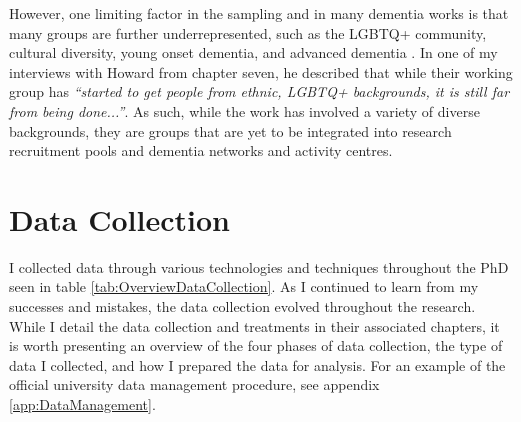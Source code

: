 However, one limiting factor in the sampling and in many dementia works is that many groups are further underrepresented, such as the LGBTQ+ community, cultural diversity, young onset dementia, and advanced dementia \citep{mcgovern2014forgotten}. In one of my interviews with Howard from chapter seven, he described that while their working group has \textit{``started to get people from ethnic, LGBTQ+ backgrounds, it is still far from being done...''}. As such, while the work has involved a variety of diverse backgrounds, they are groups that are yet to be integrated into research recruitment pools and dementia networks and activity centres. 

\section{Data Collection}
\label{Method:DataCollection}
I collected data through various technologies and techniques throughout the PhD seen in table \ref{tab:OverviewDataCollection}. As I continued to learn from my successes and mistakes, the data collection evolved throughout the research. While I detail the data collection and treatments in their associated chapters, it is worth presenting an overview of the four phases of data collection, the type of data I collected, and how I prepared the data for analysis. For an example of the official university data management procedure, see appendix \ref{app:DataManagement}.

\begin{table}[htp]
\centering
\caption{Overview of collected data}
\label{tab:OverviewDataCollection}
\end{table}

